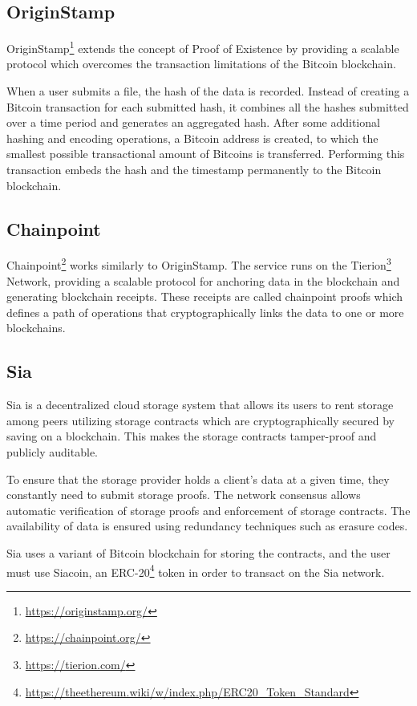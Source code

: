 \documentclass[]{article}
\begin{document}
		\subsection{OriginStamp}
			OriginStamp\cite{gipp2015decentralized}\footnote{\url{https://originstamp.org/}} extends the concept of Proof of Existence by providing a scalable protocol which overcomes the transaction limitations of the Bitcoin blockchain.
			
			When a user submits a file, the hash of the data is recorded. Instead of creating a Bitcoin transaction for each submitted hash, it combines all the hashes submitted over a time period and generates an aggregated hash. After some additional hashing and encoding operations, a Bitcoin address is created, to which the smallest possible transactional amount of Bitcoins is transferred. Performing this transaction embeds the hash and the timestamp permanently to the Bitcoin blockchain.
			
		\subsection{Chainpoint}
			Chainpoint\footnote{\url{https://chainpoint.org/}} works similarly to OriginStamp. The service runs on the Tierion\footnote{\url{https://tierion.com/}} Network, providing a scalable protocol for anchoring data in the blockchain and generating blockchain receipts. These receipts are called chainpoint proofs which defines a path of operations that cryptographically links the data to one or more blockchains.
			
		\subsection{Sia}
			Sia\cite{vorick2014sia} is a decentralized cloud storage system that allows its users to rent storage among peers utilizing storage contracts which are cryptographically secured by saving on a blockchain. This makes the storage contracts tamper-proof and publicly auditable.
			
			To ensure that the storage provider holds a client’s data at a given time, they constantly need to submit storage proofs. The network consensus allows automatic verification of storage proofs and enforcement of storage contracts. The availability of data is ensured using redundancy techniques such as erasure codes.
			
			Sia uses a variant of Bitcoin blockchain for storing the contracts, and the user must use Siacoin, an ERC-20\footnote{\url{https://theethereum.wiki/w/index.php/ERC20_Token_Standard}} token in order to transact on the Sia network.
		
\end{document}
